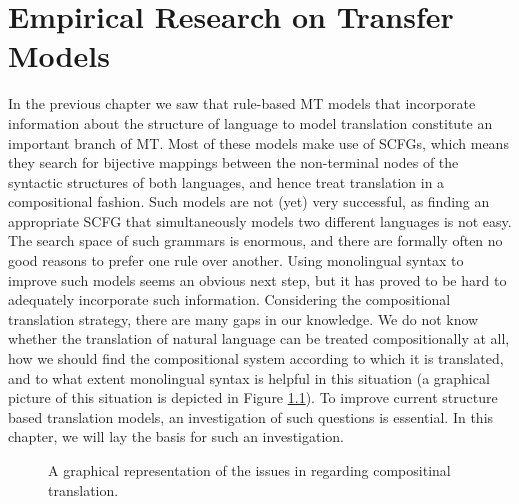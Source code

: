 \chapter{Empirical Research on Transfer Models}
\label{ch:empirical}

In the previous chapter we saw that rule-based MT models that incorporate information about the structure of language to model translation constitute an important branch of MT. Most of these models make use of SCFGs, which means they search  for bijective mappings between the non-terminal nodes of the syntactic structures of both languages, and hence treat translation in a compositional fashion. Such models are not (yet) very successful, as finding an appropriate SCFG that simultaneously models two different languages is not easy. The search space of such grammars is enormous, and there are formally often no good reasons to prefer one rule over another. Using monolingual syntax to improve such models seems an obvious next step, but it has proved to be hard to adequately incorporate such information. Considering the compositional translation strategy, there are many gaps in our knowledge. We do not know whether the translation of natural language can be treated compositionally at all, how we should find the compositional system according to which it is translated, and to what extent monolingual syntax is helpful in this situation (a graphical picture of this situation is depicted in Figure \ref{fig:comptrans2}). To improve current structure based translation models, an investigation of such questions is essential. In this chapter, we will lay the basis for such an investigation. 

\begin{figure}[!ht]
\begin{framed}
\centering

\end{framed}
\caption{A graphical representation of the issues in regarding compositinal translation.}\label{fig:comptrans2}
\end{figure}

